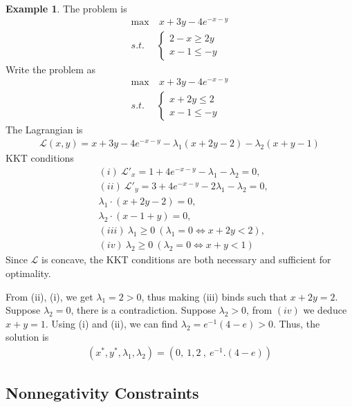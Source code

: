 \documentclass[11pt,a4paper]{book}
\theoremstyle{definition}\newtheorem{definition}{Definition}
\theoremstyle{definition}\newtheorem{fact}{Fact}
\theoremstyle{definition}\newtheorem{remark}{Remark}
\theoremstyle{definition}\newtheorem{ex}{Ex.}
\theoremstyle{definition}\newtheorem{project}{Project}
\theoremstyle{definition}\newtheorem{problem}{Problem}
\theoremstyle{definition}\newtheorem{example}{Example}
\numberwithin{theorem}{section}
\numberwithin{corollary}{chapter}
\numberwithin{assumption}{chapter}
\numberwithin{definition}{chapter}
\numberwithin{prop}{chapter}
\numberwithin{notation}{chapter}
\numberwithin{problem}{chapter}
\numberwithin{example}{chapter}
\numberwithin{fact}{chapter}
\numberwithin{ex}{chapter}
\begin{document}
			\begin{example}
		The problem is
		\begin{align*}
			\max & \ x + 3y - 4 e^{-x-y} \\
			s.t. & \begin{cases}         
				2 - x \geq 2y \\
				x-1 \leq -y
			\end{cases}
		\end{align*}
		Write the problem as
		\begin{align*}
			\max & \ x + 3y - 4 e^{-x-y} \\
			s.t. & \begin{cases}         
				x + 2y \leq 2 \\
				x-1 \leq -y
			\end{cases}
		\end{align*}
		The Lagrangian is
		\begin{align*}
			\mathcal{L}(x,y) = x + 3y - 4 e^{-x-y} - \lambda_1 (x + 2y - 2) - \lambda_2 (x+y-1) 
		\end{align*}
		KKT conditions
		\begin{align*}
			& (i) \ \mathcal{L}'_x = 1 + 4e^{-x-y} - \lambda_1 - \lambda_2 = 0,   \\
			& (ii) \ \mathcal{L}'_y = 3 + 4e^{-x-y} - 2\lambda_1 - \lambda_2 = 0, \\
			&   \lambda_1 \cdot (x+2y-2) = 0, \\
			& \lambda_2 \cdot (x-1+y) = 0, \\
			& (iii) \ \lambda_1 \geq 0 \ (\lambda_1 = 0 \iff x + 2y < 2),         \\
			& (iv) \ \lambda_2 \geq 0 \ (\lambda_2 = 0 \iff x + y < 1)            
		\end{align*}
		Since $\mathcal{L}$ is concave, the KKT conditions are both necessary and sufficient for optimality.
		
		From (ii), (i), we get $\lambda_1 = 2 > 0$, thus making (iii) binds such that $x+2y=2$. Suppose $\lambda_2=0$, there is a contradiction. Suppose $\lambda_2 > 0$, from $(iv)$ we deduce $x+y=1$. Using (i) and (ii), we can find $\lambda_2 = e^{-1} (4-e) > 0$. Thus, the solution is
		\begin{align*}
			(x^*, y^*, \lambda_1, \lambda_2) = (0, \ 1, 2\ , \ e^{-1}. (4-e)) 
		\end{align*}
	\end{example}


		\subsection{Nonnegativity Constraints}
	
\end{document}
